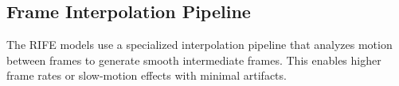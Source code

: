\documentclass[11pt, a4paper]{article}
\begin{document}
\subsection{Frame Interpolation Pipeline}
The RIFE models use a specialized interpolation pipeline that analyzes motion between frames to generate smooth intermediate frames. This enables higher frame rates or slow-motion effects with minimal artifacts.


\end{document}
